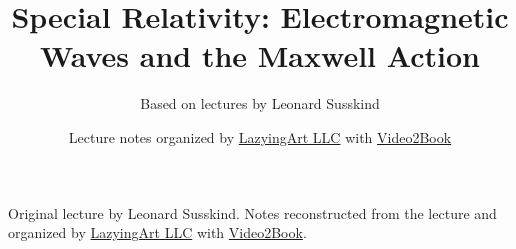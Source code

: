 \documentclass[11pt,oneside]{book}
\begin{document}
\frontmatter
\title{Special Relativity: Electromagnetic Waves and the Maxwell Action}
\author{Based on lectures by Leonard Susskind}
\date{Lecture notes organized by \href{https://lazying.art}{LazyingArt LLC} with \href{https://github.com/lachlanchen/Video2Book}{Video2Book}}
\maketitle
\begin{center}
\small Original lecture by Leonard Susskind. Notes reconstructed from the lecture and organized by \href{https://lazying.art}{LazyingArt LLC} with \href{https://github.com/lachlanchen/Video2Book}{Video2Book}.
\end{center}
\clearpage
\mainmatter

\end{document}
